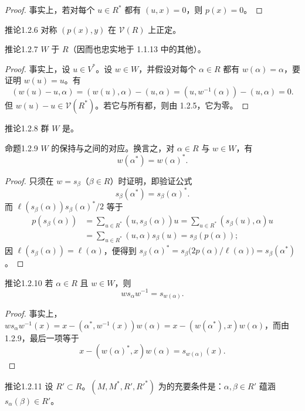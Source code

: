 \begin{proof}
事实上，若对每个 $u\in R^*$ 都有 $(u,x)=0$，则 $p(x)=0$。
\end{proof}
\begin{SGAresult}{推论}{1.2.6}
对称 $(p(x),y)$ 在 $\mathscr V(R)$ 上正定。
\end{SGAresult}
\begin{SGAresult}{推论}{1.2.7}
$W$ 于 $R$（因而也忠实地于 1.1.13 中的其他）。
\end{SGAresult}
\begin{proof}
事实上，设 $u\in V^*$。设 $w\in W$，并假设对每个 $\alpha\in R$ 都有 $w(\alpha)=\alpha$，要证明 $w(u)=u$。有
\[(w(u)-u,\alpha)=(w(u),\alpha)-(u,\alpha)=(u,w^{-1}(\alpha))-(u,\alpha)=0.\]
但 $w(u)-u\in\mathscr V(R^*)$。若它与所有都，则由 1.2.5，它为零。
\end{proof}
\begin{SGAresult}{推论}{1.2.8}
群 $W$ 是。
\end{SGAresult}

\begin{SGAresult}{命题}{1.2.9}
$W$ 的保持与之间的对应。换言之，对 $\alpha\in R$ 与 $w\in W$，有
\[w(\alpha^*)=w(\alpha)^*.\]
\end{SGAresult}
\begin{proof}
只须在 $w=s_\beta$（$\beta\in R$）时证明，即验证公式
\[s_\beta(\alpha^*)=s_\beta(\alpha)^*.\]
而 $\ell(s_\beta(\alpha))s_\beta(\alpha)^*/2$ 等于
\begin{align*}
p(s_\beta(\alpha))&=\sum_{u\in R^*}(u,s_\beta(\alpha))u
=\sum_{u\in R^*}(s_\beta(u),\alpha)u\\
&=\sum_{u\in R^*}(u,\alpha)s_\beta(u)=s_\beta(p(\alpha));
\end{align*}
因 $\ell(s_\beta(\alpha))=\ell(\alpha)$，便得到 $s_\beta(\alpha)^*=s_\beta\bigl(2p(\alpha)/\ell(\alpha)\bigr)=s_\beta(\alpha^*)$。
\end{proof}
\begin{SGAresult}{推论}{1.2.10}
若 $\alpha\in R$ 且 $w\in W$，则
\[ws_\alpha w^{-1}=s_{w(\alpha)}.\]
\end{SGAresult}
\begin{proof}
事实上，$ws_\alpha w^{-1}(x)=x-(\alpha^*,w^{-1}(x))w(\alpha)=x-(w(\alpha^*),x)w(\alpha)$，而由 1.2.9，最后一项等于
\[x-(w(\alpha)^*,x)w(\alpha)=s_{w(\alpha)}(x).\]
\end{proof}
\begin{SGAresult}{推论}{1.2.11}
设 $R'\subset R$。$(M,M^*,R',R'^*)$ 为的充要条件是：$\alpha,\beta\in R'$ 蕴涵 $s_\alpha(\beta)\in R'$。
\end{SGAresult}

